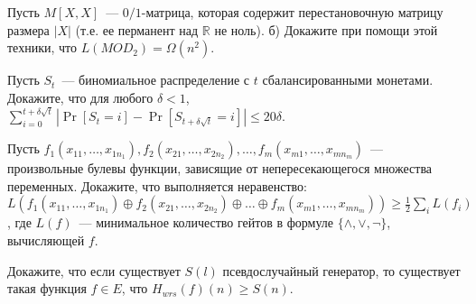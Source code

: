 \breakline


\begin{ptask}{19}
    Пусть $M[X, X]$~--- $0 / 1$-матрица, которая содержит перестановочную матрицу размера $|X|$ (т.е. ее перманент над
    $\mathbb{R}$ не ноль). б) Докажите при помощи этой техники, что $L(MOD_2) = \Omega(n^2)$.
\end{ptask}

\begin{ptask}{20}
    Пусть $S_t$~--- биномиальное распределение с $t$ сбалансированными монетами. Докажите, что для любого $\delta < 1$,
    $\sum\limits_{i = 0}^{t + \delta \sqrt{t}} |\Pr[S_t = i] - \Pr[S_{t + \delta \sqrt{t}} = i]| \le 20 \delta$.
\end{ptask}

\begin{ptask}{21}
    Пусть $f_1(x_{1 1}, \dots, x_{1 n_1}), f_2(x_{2 1}, \dots, x_{2 n_2}), \dots, f_m(x_{m 1}, \dots, x_{m n_m})$~--- произвольные
    булевы функции, зависящие от непересекающегося множества переменных. Докажите, что выполняется неравенство:\\
    $L(f_1(x_{1 1}, \dots, x_{1 n_1}) \oplus f_2(x_{2 1}, \dots, x_{2 n_2}) \oplus \dots \oplus f_m(x_{m 1}, \dots, x_{m n_m}))
    \ge \frac{1}{2} \sum\limits_{i} L(f_i)$, где $L(f)$~--- минимальное количество гейтов в формуле $\{\land, \lor, \neg\}$,
    вычисляющей $f$.
\end{ptask}

\begin{ptask}{23}
    Докажите, что если существует $S(l)$ псевдослучайный генератор, то существует такая функция $f \in E$, что $H_{wrs}(f)(n) \ge
    S(n)$.
\end{ptask}